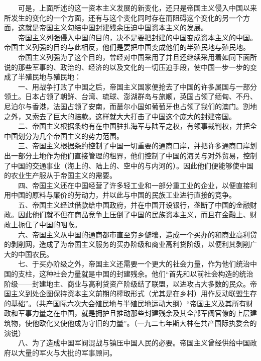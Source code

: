 \documentclass[cn,11pt,chinese]{elegantbook}
\begin{document}
　　可是，上面所述的这一资本主义发展的新变化，还只是帝国主义侵入中国以来所发生的变化的一个方面，还有与这个变化同时存在而阻碍这个变化的另一个方面，这就是帝国主义勾结中国封建残余压迫中国资本主义的发展。\\
　　帝国主义列强侵入中国的目的，决不是要把封建的中国变成资本主义的中国。帝国主义列强的目的与此相反，他们是要把中国变成他们的半殖民地与殖民地。\\
　　帝国主义列强为了这个目的，曾经对中国采用了并且还继续采用着如同下面所说的那些军事的、政治的、经济的以及文化的一切压迫手段，使中国一步一步的变成了半殖民地与殖民地：\\
　　一、用战争打败了中国之后，帝国主义国家便抢去了中国的许多属国与一部分领土。日本占领了朝鲜、台湾、琉球、澎湖群岛与旅顺，英国占领了缅甸、不丹、尼泊尔与香港，法国占领了安南，而蕞尔小国如葡萄牙也占领了我们的澳门。割地之外，又索去了巨大的赔款。这样就大大打击了中国这个庞大的封建帝国。\\
　　二、帝国主义根据条约有在中国驻扎海军与陆军之权，有领事裁判权，并把全中国划分为几个帝国主义的势力范围。\\
　　三、帝国主义根据条约控制了中国一切重要的通商口岸，并把许多通商口岸划出一部分土地作为他们直接管理的租界，他们控制了中国的海关与对外贸易，控制了中国的交通事业（海上的、陆上的、空中的与内河的）。因此他们便能够使中国的农业生产服从于帝国主义的需要。\\
　　四、帝国主义还在中国经营了许多轻工业和一部分重工业的企业，以便直接利用中国的原料与廉价的劳动力，并以此与中国的民族工业进行直接的竞争。\\
　　五、帝国主义经过借款给中国政府，并在中国开设银行，垄断了中国的金融财政。因此他们就不但在商品竞争上压倒了中国的民族资本主义，而且在金融上、财政上扼住了中国的咽喉。\\
　　六、帝国主义从中国的通商都市直至穷乡僻壤，造成一个买办的和商业高利贷的剥削网，造成了为帝国主义服务的买办阶级和商业高利贷阶级，以便利其剥削广大的中国农民。\\
　　七、于买办阶级之外，帝国主义还需要一个更大的社会力量，作为他们统治中国的支柱，这种社会力量就是中国的封建残余。他们“首先和以前社会构造的统治阶级——封建地主、商业与高利贷资产阶级结了联盟，以进攻占大多数的民众。帝国主义到处企图保持资本主义前期的榨取形式（尤其是在乡村）用作反动联盟生存的基础”。（共产国际六次大会殖民地与半殖民地运动大纲）“帝国主义及其所有财政和军事力量之在中国，就是拥护且推动那些封建残余及其全部军阀官僚的上层建筑物，使他欧化又使他成为守旧的力量”。（一九二七年斯大林在共产国际执委会的演说）\\
　　八、为了造成中国军阀混战与镇压中国人民的必要。帝国主义曾经供给中国政府以大量的军火与大批的军事顾问。\\
\end{document}
